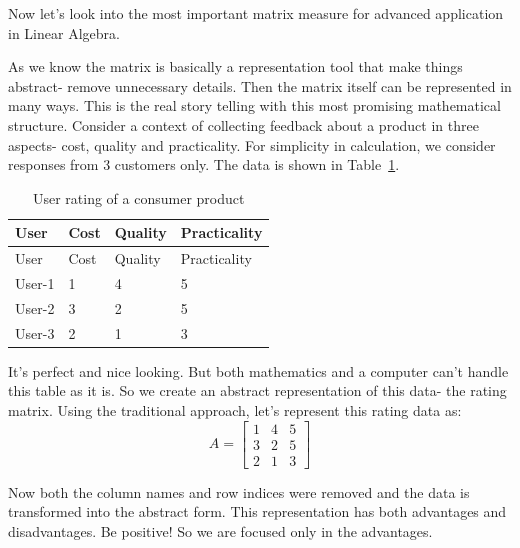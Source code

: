 \documentclass[
  letterpaper,
  DIV=11,
  numbers=noendperiod]{scrreprt}
\theoremstyle{plain}
\theoremstyle{definition}
\theoremstyle{remark}
\begin{document}
\begin{tcolorbox}
\begin{tcolorbox}
\end{tcolorbox}

Now let's look into the most important matrix measure for advanced
application in Linear Algebra.

As we know the matrix is basically a representation tool that make
things abstract- remove unnecessary details. Then the matrix itself can
be represented in many ways. This is the real story telling with this
most promising mathematical structure. Consider a context of collecting
feedback about a product in three aspects- cost, quality and
practicality. For simplicity in calculation, we consider responses from
3 customers only. The data is shown in Table~\ref{tbl-RT}.

\begin{longtable}[]{@{}llll@{}}
\caption{User rating of a consumer product}\label{tbl-RT}\tabularnewline
\toprule\noalign{}
User & Cost & Quality & Practicality \\
\midrule\noalign{}
\endfirsthead
\toprule\noalign{}
User & Cost & Quality & Practicality \\
\midrule\noalign{}
\endhead
\bottomrule\noalign{}
\endlastfoot
User-1 & 1 & 4 & 5 \\
User-2 & 3 & 2 & 5 \\
User-3 & 2 & 1 & 3 \\
\end{longtable}

It's perfect and nice looking. But both mathematics and a computer can't
handle this table as it is. So we create an abstract representation of
this data- the rating matrix. Using the traditional approach, let's
represent this rating data as:
\[A=\begin{bmatrix}1&4&5\\3&2&5\\2&1&3\end{bmatrix}\]

Now both the column names and row indices were removed and the data is
transformed into the abstract form. This representation has both
advantages and disadvantages. Be positive! So we are focused only in the
advantages.


\end{tcolorbox}
\end{document}
